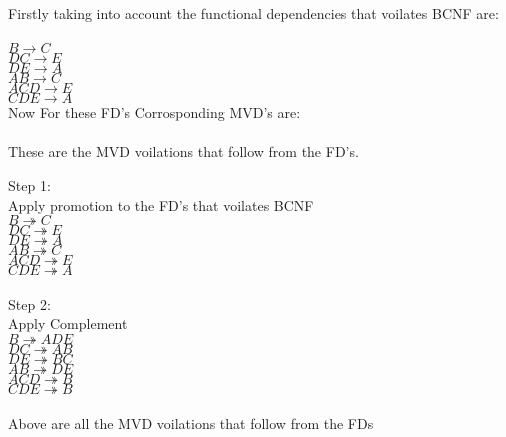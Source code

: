 
Firstly taking into account the functional dependencies that voilates BCNF are: \\ \\

$B \rightarrow C$ \\
$DC \rightarrow E$ \\
$DE \rightarrow A$ \\
$AB \rightarrow C$ \\
$ACD \rightarrow E$\\
$CDE \rightarrow A$\\
Now For these FD's Corrosponding MVD's are:\\ \\
These are the MVD voilations that follow from the FD's.

Step 1:\\
Apply promotion to the FD's that voilates BCNF \\
$B \twoheadrightarrow C$\\
$DC \twoheadrightarrow E$ \\
$DE \twoheadrightarrow A$ \\ 
$AB \twoheadrightarrow C$ \\ 
$ACD \twoheadrightarrow E$\\
$CDE \twoheadrightarrow A$\\ \\
Step 2:\\
Apply Complement \\
$B \twoheadrightarrow ADE$\\
$DC \twoheadrightarrow AB$ \\
$DE \twoheadrightarrow BC$ \\
$AB \twoheadrightarrow DE$ \\
$ACD \twoheadrightarrow B$ \\
$CDE \twoheadrightarrow B$ \\ \\

Above are all the MVD voilations that follow from the FDs\\ \\





